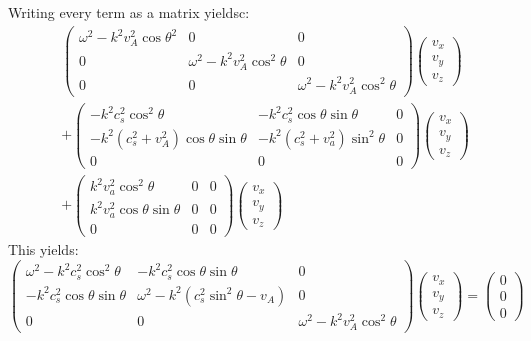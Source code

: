 \documentclass[a4paper]{article}
\numberwithin{figure}{section}
\numberwithin{equation}{section}
\begin{document}
Writing every term as a matrix yieldsc:
\begin{align*}
	&\begin{pmatrix}
		\omega^2  - k^2 v_A^2 \cos\theta^2    & 0 & 0 \\
		0 & \omega^2 - k^2v_A^2\cos^2\theta & 0 \\
		0 & 0 & \omega^2 - k^2v_A^2\cos^2\theta
	\end{pmatrix} 
	\begin{pmatrix} v_x \\ v_y \\ v_z \end{pmatrix} \\
	 & + \begin{pmatrix} 
		 -k^2 c_s^2 \cos^2 \theta & - k^2 c_s^2 \cos\theta \sin \theta  & 0 \\
		 -k^2(c_s^2 + v_A^2) \cos\theta \sin \theta & -k^2(c_s^2 + v_a^2) \sin^2\theta & 0 \\
		 0 & 0 & 0
	 \end{pmatrix} \begin{pmatrix} v_x \\ v_y \\ v_z \end{pmatrix} \\  
	 &  + \begin{pmatrix} 
		 k^2 v_a^2 \cos^2\theta & 0 & 0  \\
		 k^2 v_a^2 \cos \theta \sin \theta & 0 & 0 \\
		 0 & 0 & 0
	 \end{pmatrix} \begin{pmatrix} v_x \\ v_y \\ v_z \end{pmatrix} 
\end{align*}
This yields:
\begin{equation}\label{eq:MHD_linear_matrix}
	\begin{pmatrix}
		\omega^2  - k^2 c_s^2 \cos^2\theta   & -k^2c_s^2\cos\theta \sin \theta & 0 \\
		-k^2 c_s^2 \cos\theta \sin \theta & \omega^2 - k^2(c_s^2\sin^2\theta - v_A)   & 0 \\
		0 & 0 & \omega^2 - k^2v_A^2\cos^2\theta
	\end{pmatrix} 
	\begin{pmatrix} v_x \\ v_y \\ v_z \end{pmatrix} 
	 = \begin{pmatrix} 0 \\ 0 \\0  \end{pmatrix} 
\end{equation}
\end{document}
